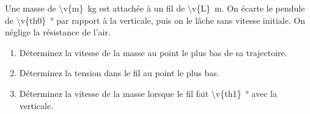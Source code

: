 Une masse de \qty{\v{m}}{kg} est attachée à un fil de \qty{\v{L}}{m}. On écarte le pendule de \qty{\v{th0}}{\degree} par rapport à la verticale, puis on le lâche sans vitesse initiale. On néglige la résistance de l'air.

\begin{enumerate}[label=\alph*)]
    \item Déterminez la vitesse de la masse au point le plus bas de sa trajectoire.
    \item Déterminez la tension dans le fil au point le plus bas.
    \item Déterminez la vitesse de la masse lorsque le fil fait \qty{\v{th1}}{\degree} avec la verticale.
\end{enumerate}
